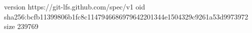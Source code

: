 version https://git-lfs.github.com/spec/v1
oid sha256:bcfb11399806b1fc8c1147946686979642201344e1504329c9261a53d9973972
size 239769
